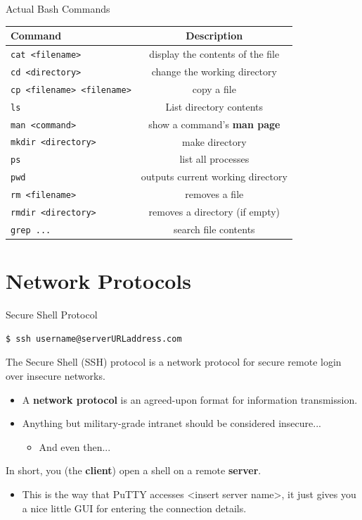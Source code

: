 \documentclass[11pt]{beamer}
\begin{document}
\begin{frame}{Actual Bash Commands}
\begin{tabular}{|| l || c |}
\hline 
Command & Description \\ \hline
\texttt{cat <filename>} & display the contents of the file \\ \hline
\texttt{cd <directory>} & change the working directory \\ \hline
\texttt{cp <filename> <filename>} & copy a file \\ \hline
\texttt{ls} & List directory contents \\ \hline
\texttt{man <command>} & show a command's \textbf{man page} \\ \hline
\texttt{mkdir <directory>} & make directory \\ \hline
\texttt{ps} & list all processes \\ \hline
\texttt{pwd} & outputs current working directory \\ \hline
\texttt{rm <filename>} & removes a file \\ \hline
\texttt{rmdir <directory>} & removes a directory (if empty) \\ \hline
\texttt{grep ...} & search file contents \\ \hline
\end{tabular}
\end{frame}


\section[Network Protocols]{Network Protocols}
\begin{frame}[fragile=singleslide]{Secure Shell Protocol}
\begin{lstlisting}[language = bash, style = C]
 $ ssh username@serverURLaddress.com 
\end{lstlisting}
The Secure Shell (SSH) protocol is a network protocol for secure remote login over insecure networks.
\begin{itemize}
\item A \textbf{network protocol} is an agreed-upon format for information transmission.
\item Anything but military-grade intranet should be considered insecure... 
	\begin{itemize}
	\item And even then...
	\end{itemize}
\end{itemize}
In short, you (the \textbf{client}) open a shell on a remote \textbf{server}.  
\begin{itemize}
\item This is the way that PuTTY accesses <insert server name>, it just gives you a nice little GUI for entering the connection details.
\end{itemize}
\end{frame}
\end{document}

